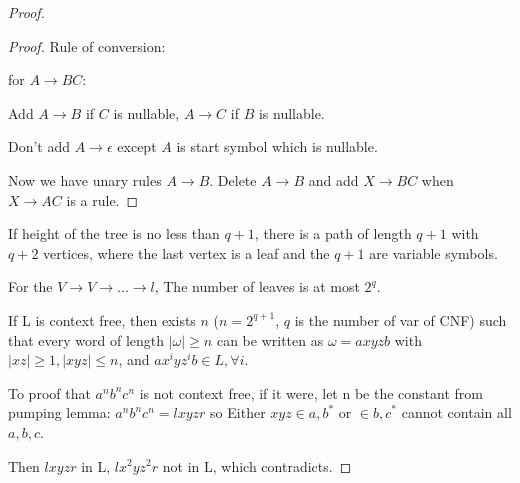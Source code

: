 \begin{proof}
\begin{proof}
  Rule of conversion:

  for \(A \rightarrow BC\):

  Add \(A \rightarrow B\) if \(C\) is nullable, \(A \rightarrow C\) if
  \(B\) is nullable.

  Don't add \(A \rightarrow \epsilon\) except \(A\) is start symbol
  which is nullable.

  Now we have unary rules \(A \rightarrow B\). Delete
  \(A \rightarrow B\) and add \(X \rightarrow BC\) when
  \(X \rightarrow AC\) is a rule.

\end{proof}


If height of the tree is no less than \(q+1\), there is a path of
length \(q+1\) with \(q+2\) vertices, where the last vertex is a leaf
and the \(q+1\) are variable symbols.

For the \(V \rightarrow V \rightarrow ... \rightarrow l\), The number
of leaves is at most \(2^q\).

If L is context free, then exists \(n\) (\(n = 2^{q+1}\), \(q\) is the
number of var of CNF) such that every word of length
\(|\omega| \ge n\) can be written as \(\omega = axyzb\) with
\(|xz| \ge 1 , |xyz| \le n\), and \(ax^iyz^ib \in L, \forall i\).

To proof that \(a^nb^nc^n\) is not context free, if it were, let n be
the constant from pumping lemma: \(a^nb^nc^n = lxyzr\) so Either
\(xyz \in {a,b}^*\) or \(\in {b,c}^*\) cannot contain all \(a, b, c\).

Then \(lxyzr\) in L, \(lx^2yz^2r\) not in L, which contradicts.
\end{proof}
